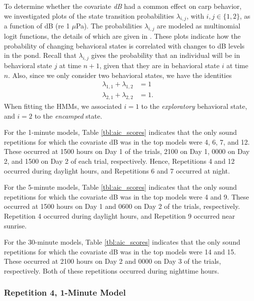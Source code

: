\documentclass[12pt]{article}
\begin{document}
		To determine whether the covariate \emph{dB} had a common effect on carp behavior, we investigated plots of the state transition probabilities $\lambda_{i, j}$, with $i, j \in \{1, 2\}$, as a function of dB (re 1 $\mu$Pa). The probabilities $\lambda_{i, j}$ are modeled as multinomial logit functions, the details of which are given in \cite{Michelot2016}. These plots indicate how the probability of changing behavioral states is correlated with changes to dB levels in the pond. Recall that $\lambda_{i, j}$ gives the probability that an individual will be in behavioral state $j$ at time $n+1$, given that they are in behavioral state $i$ at time $n$. Also, since we only consider two behavioral states, we have the identities
		\begin{align*}
			\lambda_{1, 1} + \lambda_{1, 2} &= 1 \\
			\lambda_{2, 1} + \lambda_{2, 2} & = 1.
		\end{align*}
		When fitting the HMMs, we associated $i = 1$ to the \emph{exploratory} behavioral state, and $i = 2$ to the \emph{encamped} state.
		
		For the 1-minute models, Table \ref{tbl:aic_scores} indicates that the only sound repetitions for which the covariate dB was in the top models were 4, 6, 7, and 12. These occurred at 1500 hours on Day 1 of the trials, 2100 on Day 1, 0000 on Day 2, and 1500 on Day 2 of each trial, respectively. Hence, Repetitions 4 and 12 occurred during daylight hours, and Repetitions 6 and 7 occurred at night.
		
		For the 5-minute models, Table \ref{tbl:aic_scores} indicates that the only sound repetitions for which the covariate dB was in the top models were 4 and 9. These occurred at 1500 hours on Day 1 and 0600 on Day 2 of the trials, respectively. Repetition 4 occurred during daylight hours, and Repetition 9 occurred near sunrise.
		
		For the 30-minute models, Table \ref{tbl:aic_scores} indicates that the only sound repetitions for which the covariate dB was in the top models were 14 and 15. These occurred at 2100 hours on Day 2 and 0000 on Day 3 of the trials, respectively. Both of these repetitions occurred during nighttime hours.
		
		\subsubsection{Repetition 4, 1-Minute Model}
			
\end{document}
